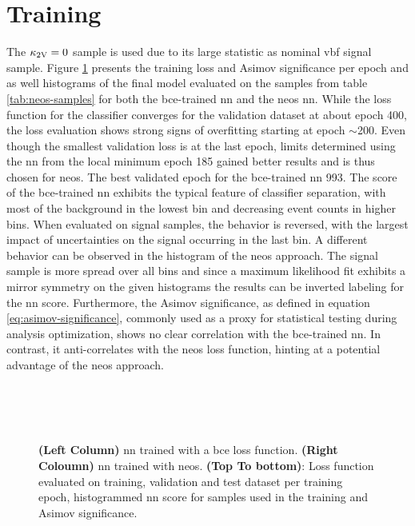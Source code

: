 \section{Training}
The $\kappa_{\text{2V}}=0$ sample is used due to its large statistic as nominal \ac{vbf} signal sample. Figure \ref{fig:training_metrics_validation} presents the training loss and Asimov significance per epoch and as well histograms of the final model evaluated on the samples from table \ref{tab:neos-samples} for both the \ac{bce}-trained \ac{nn} and the neos \ac{nn}. While the loss function for the classifier converges for the validation dataset at about epoch 400, the \cls loss evaluation shows strong signs of overfitting starting at epoch $\sim$200. Even though the smallest validation loss is at the last epoch, limits determined using the \ac{nn} from the local minimum epoch 185 gained better results and is thus chosen for \ac{neos}. The best validated epoch for the \ac{bce}-trained \ac{nn} 993. The score of the \ac{bce}-trained \ac{nn} exhibits the typical feature of classifier separation, with most of the background in the lowest bin and decreasing event counts in higher bins. When evaluated on signal samples, the behavior is reversed, with the largest impact of uncertainties on the signal occurring in the last bin. A different behavior can be observed in the histogram of the \ac{neos} approach. The signal sample is more spread over all bins and since a maximum likelihood fit exhibits a mirror symmetry on the given histograms the results can be inverted labeling for the \ac{nn} score. Furthermore, the Asimov significance, as defined in equation \ref{eq:asimov-significance}, commonly used as a proxy for statistical testing during analysis optimization, shows no clear correlation with the \ac{bce}-trained \ac{nn}. In contrast, it anti-correlates with the \ac{neos} loss function, hinting at a potential advantage of the neos approach.

\begin{figure}
    \centering
     \label{fig:neos_validation_loss}\\
     \\
     \\
    \caption[]{\textbf{(Left Column)} \ac{nn} trained with a \ac{bce} loss function. \textbf{(Right Coloumn)} \ac{nn} trained with \ac{neos}.  \textbf{(Top To bottom)}: Loss function evaluated on training, validation and test dataset per training epoch, histogrammed \ac{nn} score for samples used in the training and Asimov significance. }
    \label{fig:training_metrics_validation}
\end{figure}



